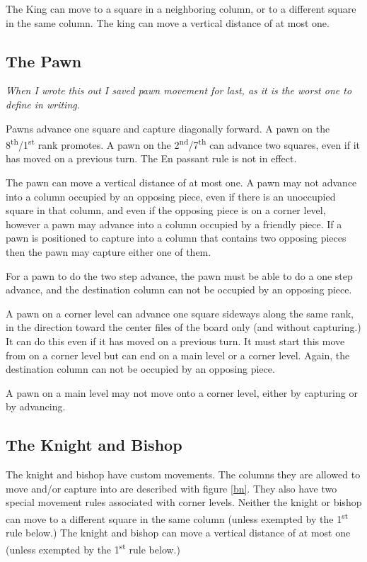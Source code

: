 \documentclass[12pt]{article} %
\begin{document}
The King can move to a square in a neighboring column, or to a different square in the same column.  The king can move a vertical distance of at most one.



\subsection{The Pawn}

\textit{When I wrote this out I saved pawn movement for last, as it is the worst one to define in writing.}

Pawns advance one square and capture diagonally forward. A pawn on the 8\textsuperscript{th}/1\textsuperscript{st} rank promotes. A pawn on the 2\textsuperscript{nd}/7\textsuperscript{th} can advance two squares, even if it has moved on a previous turn.  The En passant rule is not in effect.  

The pawn can move a vertical distance of at most one.  A pawn may not advance into a column occupied by an opposing piece, even if there is an unoccupied square in that column, and even if the opposing piece is on a corner level, however a pawn may advance into a column occupied by a friendly piece.  If a pawn is positioned to capture into a column that contains two opposing pieces then the pawn may capture either one of them. 
 
For a pawn to do the two step advance, the pawn must be able to do a one step advance, and the destination column can not be occupied by an opposing piece.

A pawn on a corner level can advance one square sideways along the same rank, in the direction toward the center files of the board only (and without capturing.)  It can do this even if it has moved on a previous turn.  It must start this move from on a corner level but can end on a main level or a corner level.  Again, the destination column can not be occupied by an opposing piece.

A pawn on a main level may not move onto a corner level, either by capturing or by advancing.

\subsection{The Knight and Bishop}

The knight and bishop have custom movements.  The columns they are allowed to move and/or capture into are described with figure \ref{bn}.  They also have two special movement rules associated with corner levels. Neither the knight or bishop can move to a different square in the same column (unless exempted by the 1\textsuperscript{st} rule below.)  The knight and bishop can move a vertical distance of at most one (unless exempted by the 1\textsuperscript{st} rule below.)  
\end{document}
